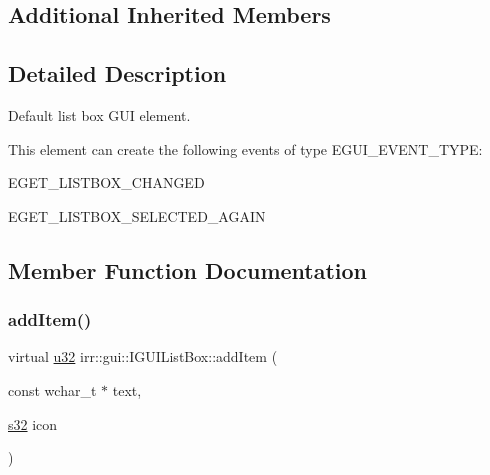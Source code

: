 \subsection*{Additional Inherited Members}


\subsection{Detailed Description}
Default list box G\+UI element. 

\begin{DoxyParagraph}{This element can create the following events of type E\+G\+U\+I\+\_\+\+E\+V\+E\+N\+T\+\_\+\+T\+Y\+PE\+:}
\begin{DoxyItemize}
\item E\+G\+E\+T\+\_\+\+L\+I\+S\+T\+B\+O\+X\+\_\+\+C\+H\+A\+N\+G\+ED \item E\+G\+E\+T\+\_\+\+L\+I\+S\+T\+B\+O\+X\+\_\+\+S\+E\+L\+E\+C\+T\+E\+D\+\_\+\+A\+G\+A\+IN \end{DoxyItemize}

\end{DoxyParagraph}


\subsection{Member Function Documentation}
\mbox{\label{classirr_1_1gui_1_1IGUIListBox_a2cfc2ff5f8f5114a92bd3618e79327e0}} 
\subsubsection{\texorpdfstring{add\+Item()}{addItem()}\hspace{0.1cm}{\footnotesize\ttfamily [1/2]}}
{\footnotesize\ttfamily virtual \hyperlink{namespaceirr_a0416a53257075833e7002efd0a18e804}{u32} irr\+::gui\+::\+I\+G\+U\+I\+List\+Box\+::add\+Item (\begin{DoxyParamCaption}\item[{const wchar\+\_\+t $\ast$}]{text,  }\item[{\hyperlink{namespaceirr_ac66849b7a6ed16e30ebede579f9b47c6}{s32}}]{icon }\end{DoxyParamCaption})\hspace{0.3cm}{\ttfamily [pure virtual]}}



